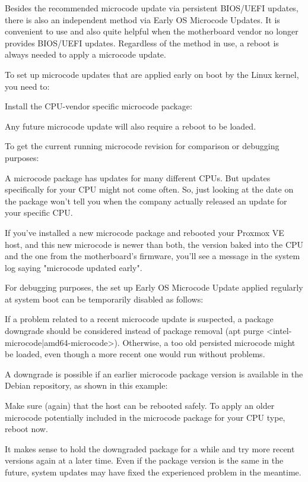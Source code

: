Besides the recommended microcode update via persistent BIOS/UEFI updates, there is also an independent method via Early OS Microcode Updates. It is convenient to use and also quite helpful when the motherboard vendor no longer provides BIOS/UEFI updates. Regardless of the method in use, a reboot is always needed to apply a microcode update.

To set up microcode updates that are applied early on boot by the Linux kernel, you need to:

Install the CPU-vendor specific microcode package:

Any future microcode update will also require a reboot to be loaded.

To get the current running microcode revision for comparison or debugging purposes:

A microcode package has updates for many different CPUs. But updates specifically for your CPU might not come often. So, just looking at the date on the package won’t tell you when the company actually released an update for your specific CPU.

If you’ve installed a new microcode package and rebooted your Proxmox VE host, and this new microcode is newer than both, the version baked into the CPU and the one from the motherboard’s firmware, you’ll see a message in the system log saying "microcode updated early".

For debugging purposes, the set up Early OS Microcode Update applied regularly at system boot can be temporarily disabled as follows:

If a problem related to a recent microcode update is suspected, a package downgrade should be considered instead of package removal (apt purge <intel-microcode|amd64-microcode>). Otherwise, a too old persisted microcode might be loaded, even though a more recent one would run without problems.

A downgrade is possible if an earlier microcode package version is available in the Debian repository, as shown in this example:

Make sure (again) that the host can be rebooted safely. To apply an older microcode potentially included in the microcode package for your CPU type, reboot now.

It makes sense to hold the downgraded package for a while and try more recent versions again at a later time. Even if the package version is the same in the future, system updates may have fixed the experienced problem in the meantime.

